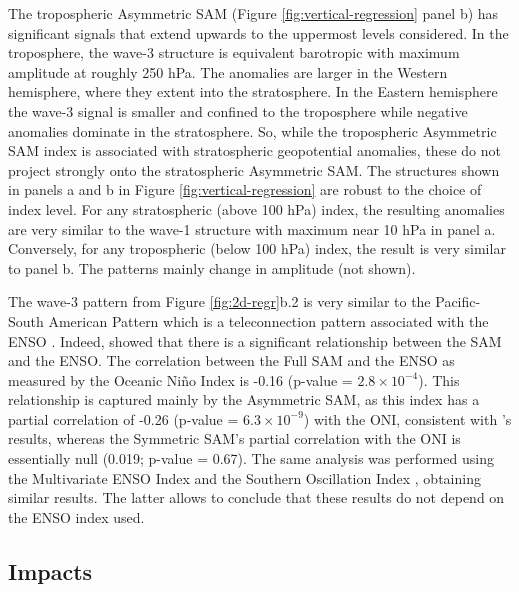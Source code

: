 \documentclass[smallextended]{svjour3}       %
\begin{document}
The tropospheric Asymmetric SAM (Figure \ref{fig:vertical-regression} panel b) has significant signals that extend upwards to the uppermost levels considered. In the troposphere, the wave-3 structure is equivalent barotropic with maximum amplitude at roughly 250 hPa. The anomalies are larger in the Western hemisphere, where they extent into the stratosphere. In the Eastern hemisphere the wave-3 signal is smaller and confined to the troposphere while negative anomalies dominate in the stratosphere. So, while the tropospheric Asymmetric SAM index is associated with stratospheric geopotential anomalies, these do not project strongly onto the stratospheric Asymmetric SAM. The structures shown in panels a and b in Figure \ref{fig:vertical-regression} are robust to the choice of index level. For any stratospheric (above 100 hPa) index, the resulting anomalies are very similar to the wave-1 structure with maximum near 10 hPa in panel a. Conversely, for any tropospheric (below 100 hPa) index, the result is very similar to panel b. The patterns mainly change in amplitude (not shown).

The wave-3 pattern from Figure \ref{fig:2d-regr}b.2 is very similar to the Pacific-South American Pattern \citep{mo1987, kidson1988} which is a teleconnection pattern associated with the ENSO \citep{karoly1989}. Indeed, \citet{fogt2011} showed that there is a significant relationship between the SAM and the ENSO. The correlation between the Full SAM and the ENSO as measured by the Oceanic Niño Index \citep[ONI,][]{bamston1997} is -0.16 (p-value = \ensuremath{2.8\times 10^{-4}}). This relationship is captured mainly by the Asymmetric SAM, as this index has a partial correlation of -0.26 (p-value = \ensuremath{6.3\times 10^{-9}}) with the ONI, consistent with \citet{fan2007}'s results, whereas the Symmetric SAM's partial correlation with the ONI is essentially null (0.019; p-value = 0.67). The same analysis was performed using the Multivariate ENSO Index \citep{wolter2011} and the Southern Oscillation Index \citep{ropelewski1987}, obtaining similar results. The latter allows to conclude that these results do not depend on the ENSO index used.

\hypertarget{impacts}{%
\subsection{Impacts}\label{impacts}}
\end{document}
